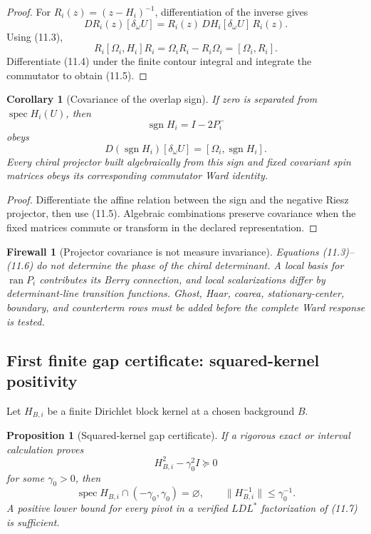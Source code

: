 \documentclass[11pt]{article}
\newtheorem{proposition}[theorem]{Proposition}
\newtheorem{corollary}[theorem]{Corollary}
\newtheorem{firewall}[theorem]{Firewall}
\newcommand{\spec}{\operatorname{spec}}
\begin{document}
\begin{proof}
For \(R_i(z)=(z-H_i)^{-1}\), differentiation of the inverse gives
\[
 DR_i(z)[\delta_\omega U]
 =
 R_i(z)\,DH_i[\delta_\omega U]\,R_i(z).
\]
Using (11.3),
\[
 R_i[\Omega_i,H_i]R_i
 =
 \Omega_iR_i-R_i\Omega_i
 =
 [\Omega_i,R_i].
\]
Differentiate (11.4) under the finite contour integral and integrate the
commutator to obtain (11.5).
\end{proof}

\begin{corollary}[Covariance of the overlap sign]
\label{cor:v11v11-sign}
If zero is separated from \(\spec H_i(U)\), then
\[
 \operatorname{sgn}H_i=I-2P_i^-
\]
obeys
\[
 D(\operatorname{sgn}H_i)[\delta_\omega U]
 =
 [\Omega_i,\operatorname{sgn}H_i].
 \tag{11.6}
\]
Every chiral projector built algebraically from this sign and fixed
covariant spin matrices obeys its corresponding commutator Ward identity.
\end{corollary}

\begin{proof}
Differentiate the affine relation between the sign and the negative Riesz
projector, then use (11.5).  Algebraic combinations preserve covariance
when the fixed matrices commute or transform in the declared
representation.
\end{proof}

\begin{firewall}[Projector covariance is not measure invariance]
\label{fw:v11v11-phase}
Equations (11.3)--(11.6) do not determine the phase of the chiral
determinant.  A local basis for \(\operatorname{ran}P_i\) contributes its
Berry connection, and local scalarizations differ by determinant-line
transition functions.  Ghost, Haar, coarea, stationary-center, boundary,
and counterterm rows must be added before the complete Ward response is
tested.
\end{firewall}

\subsection{First finite gap certificate: squared-kernel positivity}

Let \(H_{B,i}\) be a finite Dirichlet block kernel at a chosen background
\(B\).

\begin{proposition}[Squared-kernel gap certificate]
\label{prop:v11v11-square-gap}
If a rigorous exact or interval calculation proves
\[
 H_{B,i}^2-\gamma_0^2I\succeq0
 \tag{11.7}
\]
for some \(\gamma_0>0\), then
\[
 \spec H_{B,i}\cap(-\gamma_0,\gamma_0)=\varnothing,
 \qquad
 \|H_{B,i}^{-1}\|\leq\gamma_0^{-1}.
 \tag{11.8}
\]
A positive lower bound for every pivot in a verified
\(LDL^*\) factorization of (11.7) is sufficient.
\end{proposition}
\end{document}
